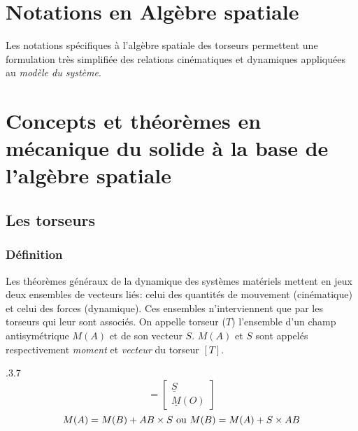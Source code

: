 
\chapter{Notations en Algèbre spatiale} \label{appx_notations}

Les notations spécifiques à l'algèbre spatiale des torseurs permettent une formulation très simplifiée des relations cinématiques et dynamiques appliquées au \emph{modèle du système}.\\


\chapter{Concepts et théorèmes en mécanique du solide à la base de l'algèbre spatiale} \label{appx_torseursToalgSpa}

\section{Les torseurs} \label{appx_torseursToalgSpa_torseurs}


\subsection{Définition} \label{appx_torseursToalgSpa_torseurs_def}
Les théorèmes généraux de la dynamique des systèmes matériels mettent en jeux deux ensembles de vecteurs liés: celui des quantités de mouvement (cinématique) et celui des forces (dynamique). Ces ensembles n'interviennent que par les torseurs qui leur sont associés. On appelle torseur ($T$) l'ensemble d'un champ antisymétrique $M(A)$ et de son vecteur $S$. $M(A)$ et $S$ sont appelés respectivement \emph{moment} et \emph{vecteur} du torseur $[T]$.

\vspace{0.3cm} %

{.3}{.7}{}
{%
\begin{equation*}
[\underline{T}]=
\begin{bmatrix}
  \underline{S} \\
  \underline{M}(O)
\end{bmatrix}
\end{equation*}
}
{%
\begin{equation}
M(A)=M(B)+AB \times S \textnormal{ ou } M(B)=M(A)+S \times AB
\end{equation}
}
{}

\vspace{0.3cm} %

